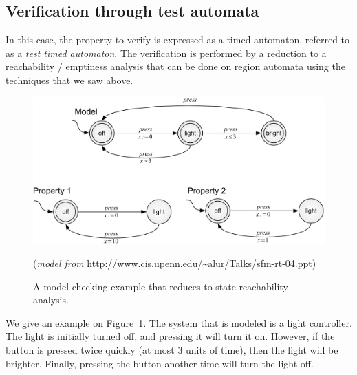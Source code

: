 
\subsection{Verification through test automata}


In this case, the property to verify is expressed as a timed automaton, referred to as a \emph{test timed automaton}. The verification is performed by a reduction to a reachability / emptiness analysis that can be done on region automata using the techniques that we saw above. \\

\begin{figure}[htbp]
    \includegraphics[width=\textwidth]{content/timed-automata/light-verification-inclusion}

    \begin{flushright}
    (\textit{model from} \url{http://www.cis.upenn.edu/~alur/Talks/sfm-rt-04.ppt})
    \end{flushright}

    \caption{A model checking example that reduces to state reachability analysis.}
    \label{fig:light-verification-inclusion}
\end{figure}

We give an example on Figure~\ref{fig:light-verification-inclusion}. The system that is modeled is a light controller. The light is initially turned off, and pressing it will turn it on. However, if the button is pressed twice quickly (at most 3 units of time), then the light will be brighter. Finally, pressing the button another time will turn the light off.\\

